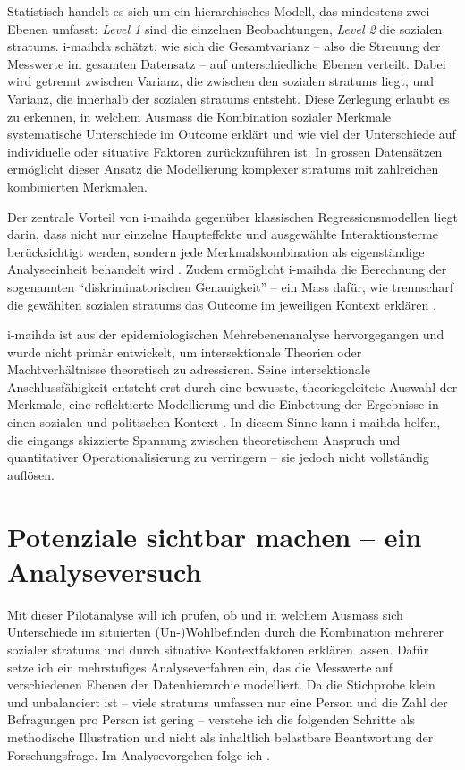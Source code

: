 Statistisch handelt es sich um ein hierarchisches Modell, das mindestens zwei Ebenen umfasst: \textit{Level 1} sind die einzelnen Beobachtungen, \textit{Level 2} die sozialen \glspl{stratum}. \gls{i-maihda} schätzt, wie sich die Gesamtvarianz -- also die Streuung der Messwerte im gesamten Datensatz -- auf unterschiedliche Ebenen verteilt. Dabei wird getrennt zwischen Varianz, die zwischen den sozialen \glspl{stratum} liegt, und Varianz, die innerhalb der sozialen \glspl{stratum} entsteht. Diese Zerlegung erlaubt es zu erkennen, in welchem Ausmass die Kombination sozialer Merkmale systematische Unterschiede im Outcome erklärt und wie viel der Unterschiede auf individuelle oder situative Faktoren zurückzuführen ist. In grossen Datensätzen ermöglicht dieser Ansatz die Modellierung komplexer \glspl{stratum} mit zahlreichen kombinierten Merkmalen.

Der zentrale Vorteil von \gls{i-maihda} gegenüber klassischen Regressionsmodellen liegt darin, dass nicht nur einzelne Haupteffekte und ausgewählte Interaktionsterme berücksichtigt werden, sondern jede Merkmalskombination als eigenständige Analyseeinheit behandelt wird \parencite{scottIntersectionalityQuantitativeMethods2017,bowlegInvitedReflectionQuantifying2016}. Zudem ermöglicht \gls{i-maihda} die Berechnung der sogenannten \enquote{diskriminatorischen Genauigkeit} -- ein Mass dafür, wie trennscharf die gewählten sozialen \glspl{stratum} das Outcome im jeweiligen Kontext erklären \parencite{evansTutorialConductingIntersectional2024}.

\gls{i-maihda} ist aus der epidemiologischen Mehrebenenanalyse hervorgegangen und wurde nicht primär entwickelt, um intersektionale Theorien oder Machtverhältnisse theoretisch zu adressieren. Seine intersektionale Anschlussfähigkeit entsteht erst durch eine bewusste, theoriegeleitete Auswahl der Merkmale, eine reflektierte Modellierung und die Einbettung der Ergebnisse in einen sozialen und politischen Kontext \parencite{grossModellingIntersectionalityQuantitative2023}. In diesem Sinne kann \gls{i-maihda} helfen, die eingangs skizzierte Spannung zwischen theoretischem Anspruch und quantitativer Operationalisierung zu verringern -- sie jedoch nicht vollständig auflösen.

\section{Potenziale sichtbar machen -- ein Analyseversuch}

Mit dieser Pilotanalyse will ich prüfen, ob und in welchem Ausmass sich Unterschiede im situierten (Un\nobreakdash-)Wohl\-be\-find\-en durch die Kombination mehrerer sozialer \glspl{stratum} und durch situative Kontextfaktoren erklären lassen. Dafür setze ich ein mehrstufiges Analyseverfahren ein, das die Messwerte auf verschiedenen Ebenen der Datenhierarchie modelliert. Da die Stichprobe klein und unbalanciert ist -- viele \glspl{stratum} umfassen nur eine Person und die Zahl der Befragungen pro Person ist gering -- verstehe ich die folgenden Schritte als methodische Illustration und nicht als inhaltlich belastbare Beantwortung der Forschungsfrage. Im Analysevorgehen folge ich \textcite{evansTutorialConductingIntersectional2024}.

